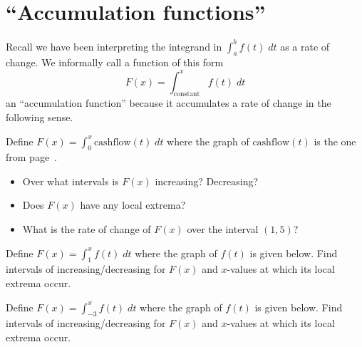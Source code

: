 \documentclass[../main.tex]{subfiles}
\begin{document}
 
\section{\enquote{Accumulation functions}}

Recall we have been interpreting the integrand in \(\int_{a}^{b} f(t) \;dt\) as a rate of change. We informally call a function of this form
\[
  F(x) = \int_{\text{constant}}^{x} f(t) \;dt
\]
an \enquote{accumulation function} because it accumulates a rate of change in the following sense. 

\begin{example}
  Define \(F(x) = \int_{0}^{x} \text{cashflow}(t) \;dt\) where the graph of \(\text{cashflow}(t)\) is the one from page~\pageref{item:cashflow-example}.

  \begin{center}
    
  \end{center}

  \begin{itemize}[wide]
    \item Over what intervals is \(F(x)\) increasing? Decreasing?

      \blanks*

    \item Does \(F(x)\) have any local extrema?
      \blanks*

    \item What is the rate of change of \(F(x)\) over the interval \((1,5)\)?
      \blanks*
  \end{itemize}
\end{example}
\clearpage

\begin{exercise}
  Define \(F(x) = \int_{1}^{x} f(t) \;dt\) where the graph of \(f(t)\) is given below. Find intervals of increasing/decreasing for \(F(x)\) and \(x\)-values at which its local extrema occur. 

  \begin{center}
    
  \end{center}

  \blanks*
\end{exercise}

\begin{exercise}
  Define \(F(x) = \int_{-3}^{x} f(t) \;dt\) where the graph of \(f(t)\) is given below. Find intervals of increasing/decreasing for \(F(x)\) and \(x\)-values at which its local extrema occur. 

  \begin{center}
    
  \end{center}

  \blanks*
\end{exercise}
\clearpage
\end{document}
